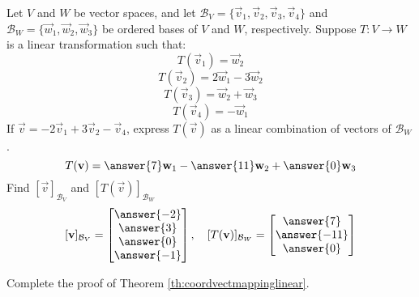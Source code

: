 \documentclass{ximera}
\begin{document}
\begin{problem}\label{prob:lintransandbasis4} Let $V$ and $W$ be vector spaces, and let $\mathcal{B}_V=\{\vec{v}_1, \vec{v}_2, \vec{v}_3, \vec{v}_4\}$ and $\mathcal{B}_W=\{\vec{w}_1,\vec{w}_2, \vec{w}_3\}$ be ordered bases of $V$ and $W$, respectively.  Suppose $T:V\rightarrow W$ is a linear transformation such that: $$T(\vec{v}_1)=\vec{w}_2$$ $$T(\vec{v}_2)=2\vec{w}_1-3\vec{w}_2$$
$$T(\vec{v}_3)=\vec{w}_2+\vec{w}_3$$
$$T(\vec{v}_4)=-\vec{w}_1$$
If $\vec{v}=-2\vec{v}_1+3\vec{v}_2-\vec{v}_4$, express $T(\vec{v})$ as a linear combination of vectors of $\mathcal{B}_W$.
$$T(\vec{v})=\answer{7}\vec{w}_1-\answer{11}\vec{w}_2+\answer{0}\vec{w}_3$$
Find $[\vec{v}]_{\mathcal{B}_V}$ and $[T(\vec{v})]_{\mathcal{B}_{W}}$
$$[\vec{v}]_{\mathcal{B}_V}=\begin{bmatrix}\answer{-2}\\\answer{3}\\\answer{0}\\\answer{-1}\end{bmatrix},\quad [T(\vec{v})]_{\mathcal{B}_{W}}=\begin{bmatrix}\answer{7}\\\answer{-11}\\\answer{0}\end{bmatrix}$$
\end{problem}



\begin{problem}\label{prob:completeproofoflin}
Complete the proof of Theorem \ref{th:coordvectmappinglinear}.
\end{problem}
\end{document}
